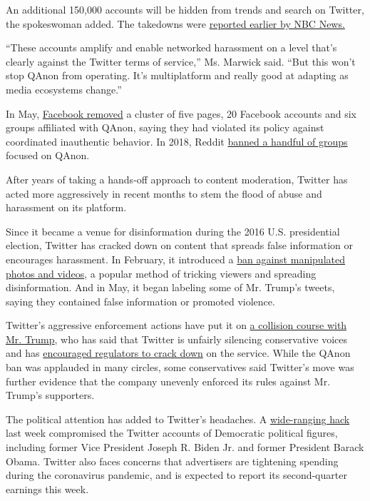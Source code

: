 An additional 150,000 accounts will be hidden from trends and search on
Twitter, the spokeswoman added. The takedowns were
\href{https://www.nbcnews.com/tech/tech-news/twitter-bans-7-000-qanon-accounts-limits-150-000-others-n1234541}{reported
earlier by NBC News.}

``These accounts amplify and enable networked harassment on a level
that's clearly against the Twitter terms of service,'' Ms. Marwick said.
``But this won't stop QAnon from operating. It's multiplatform and
really good at adapting as media ecosystems change.''

In May,
\href{https://about.fb.com/news/2020/05/april-cib-report/}{Facebook
removed} a cluster of five pages, 20 Facebook accounts and six groups
affiliated with QAnon, saying they had violated its policy against
coordinated inauthentic behavior. In 2018, Reddit
\href{https://www.washingtonpost.com/news/the-intersect/wp/2018/09/12/reddit-bans-r-greatawakening-the-main-subreddit-for-qanon-conspiracy-theorists/}{banned
a handful of groups} focused on QAnon.

After years of taking a hands-off approach to content moderation,
Twitter has acted more aggressively in recent months to stem the flood
of abuse and harassment on its platform.

Since it became a venue for disinformation during the 2016 U.S.
presidential election, Twitter has cracked down on content that spreads
false information or encourages harassment. In February, it introduced a
\href{https://www.nytimes.com/2020/02/04/technology/twitter-fake-videos-photos-disinformation.html}{ban
against manipulated photos and videos}, a popular method of tricking
viewers and spreading disinformation. And in May, it began labeling some
of Mr. Trump's tweets, saying they contained false information or
promoted violence.

Twitter's aggressive enforcement actions have put it on
\href{https://www.nytimes.com/2020/05/30/technology/twitter-trump-dorsey.html}{a
collision course with Mr. Trump}, who has said that Twitter is unfairly
silencing conservative voices and has
\href{https://www.nytimes.com/2020/05/28/us/politics/trump-order-social-media.html}{encouraged
regulators to crack down} on the service. While the QAnon ban was
applauded in many circles, some conservatives said Twitter's move was
further evidence that the company unevenly enforced its rules against
Mr. Trump's supporters.

The political attention has added to Twitter's headaches. A
\href{https://www.nytimes.com/2020/07/17/technology/twitter-hackers-interview.html}{wide-ranging
hack} last week compromised the Twitter accounts of Democratic political
figures, including former Vice President Joseph R. Biden Jr. and former
President Barack Obama. Twitter also faces concerns that advertisers are
tightening spending during the coronavirus pandemic, and is expected to
report its second-quarter earnings this week.

